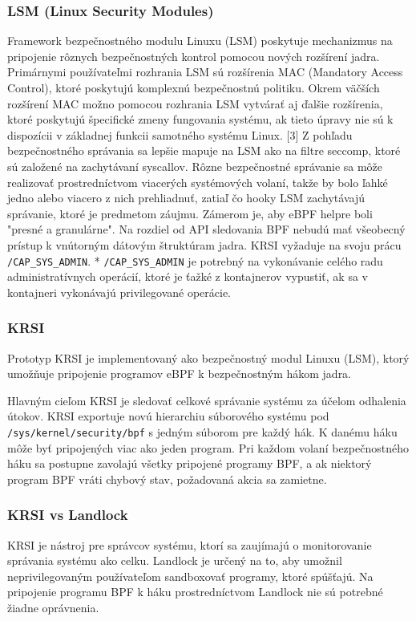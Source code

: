 \subsubsection{LSM (Linux Security Modules)}
Framework bezpečnostného modulu Linuxu (LSM) poskytuje mechanizmus na pripojenie rôznych bezpečnostných kontrol pomocou nových rozšírení jadra. Primárnymi používateľmi rozhrania LSM sú rozšírenia MAC (Mandatory Access Control), ktoré poskytujú komplexnú bezpečnostnú politiku. Okrem väčších rozšírení MAC možno pomocou rozhrania LSM vytvárať aj ďalšie rozšírenia, ktoré poskytujú špecifické zmeny fungovania systému, ak tieto úpravy nie sú k dispozícii v základnej funkcii samotného systému Linux. [3]
Z pohľadu bezpečnostného správania sa lepšie mapuje na LSM ako na filtre seccomp, ktoré sú založené na zachytávaní syscallov. Rôzne bezpečnostné správanie sa môže realizovať prostredníctvom viacerých systémových volaní, takže by bolo ľahké jedno alebo viacero z nich prehliadnuť, zatiaľ čo hooky LSM zachytávajú správanie, ktoré je predmetom záujmu. Zámerom je, aby eBPF helpre boli "presné a granulárne". Na rozdiel od API sledovania BPF nebudú mať všeobecný prístup k vnútorným dátovým štruktúram jadra. 
KRSI vyžaduje na svoju prácu \texttt{/CAP\_SYS\_ADMIN}.
* \texttt{/CAP\_SYS\_ADMIN} je potrebný na vykonávanie celého radu administratívnych operácií, ktoré je ťažké z kontajnerov vypustiť, ak sa v kontajneri vykonávajú privilegované operácie.

\subsubsection{KRSI}
Prototyp KRSI je implementovaný ako bezpečnostný modul Linuxu (LSM), ktorý umožňuje pripojenie programov eBPF k bezpečnostným hákom jadra.

Hlavným cieľom KRSI je sledovať celkové správanie systému za účelom odhalenia útokov. 
KRSI exportuje novú hierarchiu súborového systému pod \texttt{/sys/kernel/security/bpf} s jedným súborom pre každý hák.
K danému háku môže byť pripojených viac ako jeden program.
Pri každom volaní bezpečnostného háku sa postupne zavolajú všetky pripojené programy BPF, a ak niektorý program BPF vráti chybový stav, požadovaná akcia sa zamietne.

\subsubsection*{KRSI vs Landlock} 
KRSI je nástroj pre správcov systému, ktorí sa zaujímajú o monitorovanie správania systému ako celku.
Landlock je určený na to, aby umožnil neprivilegovaným používateľom sandboxovať programy, ktoré spúšťajú.  
Na pripojenie programu BPF k háku prostredníctvom Landlock nie sú potrebné žiadne oprávnenia.

